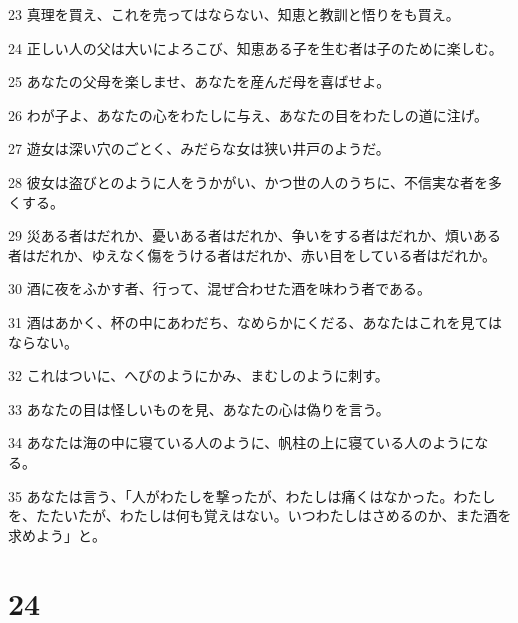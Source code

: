 \par 23 真理を買え、これを売ってはならない、知恵と教訓と悟りをも買え。
\par 24 正しい人の父は大いによろこび、知恵ある子を生む者は子のために楽しむ。
\par 25 あなたの父母を楽しませ、あなたを産んだ母を喜ばせよ。
\par 26 わが子よ、あなたの心をわたしに与え、あなたの目をわたしの道に注げ。
\par 27 遊女は深い穴のごとく、みだらな女は狭い井戸のようだ。
\par 28 彼女は盗びとのように人をうかがい、かつ世の人のうちに、不信実な者を多くする。
\par 29 災ある者はだれか、憂いある者はだれか、争いをする者はだれか、煩いある者はだれか、ゆえなく傷をうける者はだれか、赤い目をしている者はだれか。
\par 30 酒に夜をふかす者、行って、混ぜ合わせた酒を味わう者である。
\par 31 酒はあかく、杯の中にあわだち、なめらかにくだる、あなたはこれを見てはならない。
\par 32 これはついに、へびのようにかみ、まむしのように刺す。
\par 33 あなたの目は怪しいものを見、あなたの心は偽りを言う。
\par 34 あなたは海の中に寝ている人のように、帆柱の上に寝ている人のようになる。
\par 35 あなたは言う、「人がわたしを撃ったが、わたしは痛くはなかった。わたしを、たたいたが、わたしは何も覚えはない。いつわたしはさめるのか、また酒を求めよう」と。

\chapter{24}

